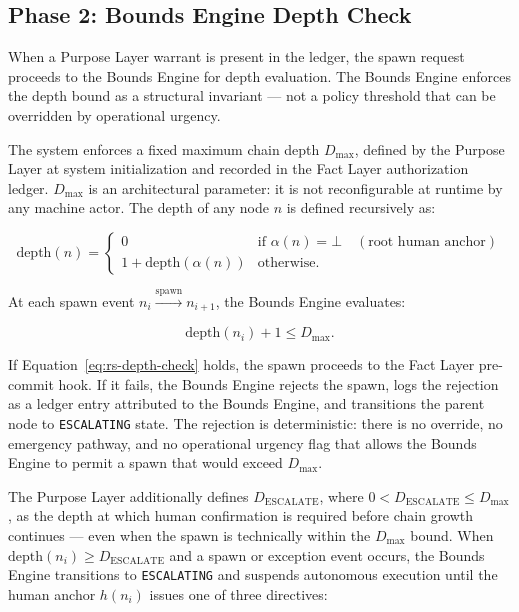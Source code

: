 \subsection{Phase 2: Bounds Engine Depth Check}
\label{sec:rs-phase2}

When a Purpose Layer warrant is present in the ledger, the spawn request proceeds to the Bounds Engine for depth evaluation. The Bounds Engine enforces the depth bound as a structural invariant — not a policy threshold that can be overridden by operational urgency.

The system enforces a fixed maximum chain depth $D_{\max}$, defined by the Purpose Layer at system initialization and recorded in the Fact Layer authorization ledger. $D_{\max}$ is an architectural parameter: it is not reconfigurable at runtime by any machine actor. The depth of any node $n$ is defined recursively as:

\begin{equation}
\text{depth}(n) =
\begin{cases}
0 & \text{if } \alpha(n) = \bot \quad (\text{root human anchor}) \\[6pt]
1 + \text{depth}(\alpha(n)) & \text{otherwise}.
\end{cases}
\label{eq:rs-depth}
\end{equation}

At each spawn event $n_i \xrightarrow{\text{spawn}} n_{i+1}$, the Bounds Engine evaluates:

\begin{equation}
\text{depth}(n_i) + 1 \leq D_{\max}.
\label{eq:rs-depth-check}
\end{equation}

If Equation~\ref{eq:rs-depth-check} holds, the spawn proceeds to the Fact Layer pre-commit hook. If it fails, the Bounds Engine rejects the spawn, logs the rejection as a ledger entry attributed to the Bounds Engine, and transitions the parent node to \texttt{ESCALATING} state. The rejection is deterministic: there is no override, no emergency pathway, and no operational urgency flag that allows the Bounds Engine to permit a spawn that would exceed $D_{\max}$.

The Purpose Layer additionally defines $D_{\text{ESCALATE}}$, where $0 < D_{\text{ESCALATE}} \leq D_{\max}$, as the depth at which human confirmation is required before chain growth continues — even when the spawn is technically within the $D_{\max}$ bound. When $\text{depth}(n_i) \geq D_{\text{ESCALATE}}$ and a spawn or exception event occurs, the Bounds Engine transitions to \texttt{ESCALATING} and suspends autonomous execution until the human anchor $h(n_i)$ issues one of three directives:

